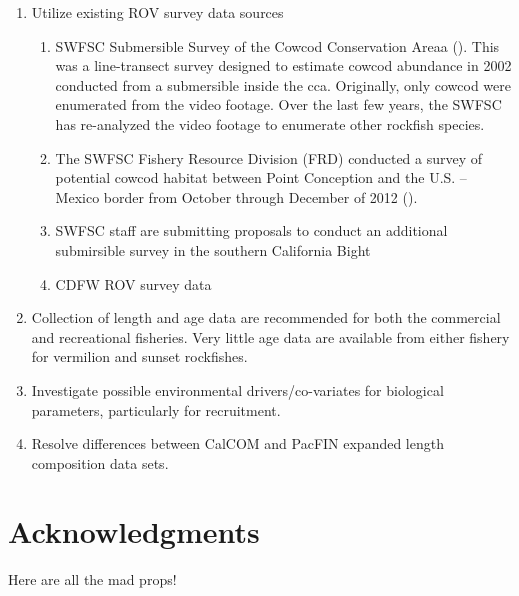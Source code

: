 \documentclass[11pt,
  english,
  a4paper,
]{article}
\begin{document}
\begin{enumerate}
\item Utilize existing ROV survey data sources

 \begin{enumerate}
     \item SWFSC Submersible Survey of the Cowcod Conservation Areaa (\cite{Yok2007}). 
    This was a line-transect survey designed to estimate cowcod abundance in 2002 conducted from a submersible inside the \gls{cca}.  Originally, only cowcod were enumerated from the video footage.  Over the last few years, the SWFSC has re-analyzed the video footage to enumerate other rockfish species. 
     \item The SWFSC Fishery Resource Division (FRD) conducted a survey of potential cowcod habitat between Point Conception and the U.S. – Mexico border from October through December of 2012 (\cite{Stierhoff2013}).
     \item SWFSC staff are submitting proposals to conduct an additional submirsible survey in the southern California Bight
      \item CDFW ROV survey data
    \end{enumerate}


\item Collection of length and age data are recommended for both the commercial and 
recreational fisheries.  Very little age data are available from either fishery for 
vermilion and sunset rockfishes.

\item Investigate possible environmental drivers/co-variates for biological parameters, 
particularly for recruitment.

\item Resolve differences between CalCOM and PacFIN expanded length composition data sets. 

\end{enumerate}


\hypertarget{acknowledgments}{%
\section{Acknowledgments}\label{acknowledgments}}

\leavevmode\tagmcend\tagstructend

Here are all the mad props!


\end{document}
